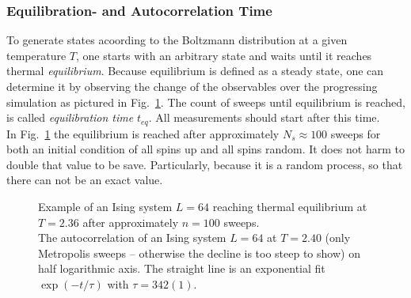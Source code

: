     \subsubsection{Equilibration- and Autocorrelation Time}
    \label{sssec:eqtime}
        To generate states acoording to the Boltzmann distribution at a
        given temperature \(T\), one starts with an arbitrary state
        and waits until it reaches thermal \emph{equilibrium}. Because
        equilibrium is defined as a steady state, one can determine it by
        observing the change of the observables over the progressing
        simulation as pictured in Fig.\ \ref{fig:equiandauto}.
        The count of sweeps until
        equilibrium is reached, is called \emph{equilibration time} \(t_{eq}\).
        All measurements should start after this time.\\
        In Fig.\ \ref{fig:equiandauto}
        the equilibrium is reached after approximately \(N_{s} \approx 100\) sweeps for
        both an initial condition of all spins up and all spins random. It
        does not harm to double that value to be save. Particularly, because
        it is a random process, so that there can not be an exact value.
        \begin{figure}[htbp]
            \centering
            \caption[Examples for Equilibration and Autocorrelation]
            {
                 Example of an Ising system
                    \(L=64\) reaching thermal equilibrium at \(T=2.36\) after
                    approximately \(n=100\) sweeps.\\
                 The autocorrelation of an
                    Ising system \(L=64\) at \(T=2.40\) (only Metropolis
                    sweeps -- otherwise the decline is too steep to show)
                    on half logarithmic axis.
                    The straight line is an exponential fit \(\exp(-t/\tau)\)
                    with \(\tau = 342(1)\).
            }
            \label{fig:equiandauto}
        \end{figure}\\
